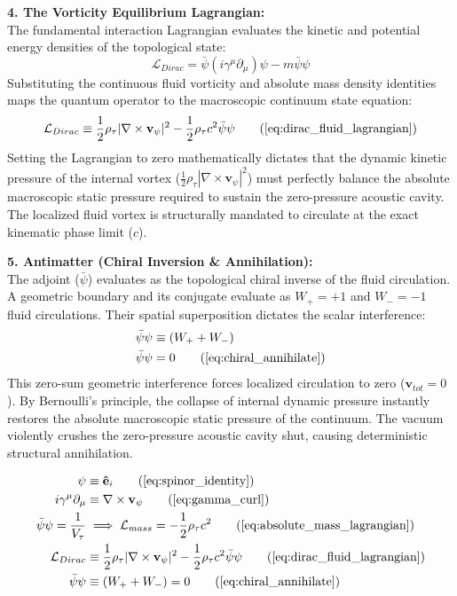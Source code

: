 \documentclass[11pt, a4paper]{article}
\begin{document}
\textbf{4. The Vorticity Equilibrium Lagrangian:} \\
The fundamental interaction Lagrangian evaluates the kinetic and potential energy densities of the topological state:
\begin{equation}
    \mathcal{L}_{Dirac} = \bar{\psi} (i\gamma^\mu \partial_\mu) \psi - m\bar{\psi}\psi 
\end{equation}
Substituting the continuous fluid vorticity and absolute mass density identities maps the quantum operator   to the macroscopic continuum state equation:
\begin{equation}
    \mathcal{L}_{Dirac} \equiv \frac{1}{2}\rho_{\tau} |\nabla \times \mathbf{v}_\psi|^2 - \frac{1}{2} \rho_{\tau} c^2 \bar{\psi}\psi \tag{\ref{eq:dirac_fluid_lagrangian}}
\end{equation}
Setting the Lagrangian to zero mathematically dictates that the dynamic kinetic pressure of the internal vortex ($\frac{1}{2}\rho_{\tau} |\nabla \times \mathbf{v}_\psi|^2$) must perfectly balance the absolute macroscopic static pressure required to sustain the zero-pressure acoustic cavity. The localized fluid vortex is structurally mandated to circulate at the exact kinematic phase limit ($c$).

\textbf{5. Antimatter (Chiral Inversion \& Annihilation):} \\
The adjoint ($\bar{\psi}$) evaluates as the topological chiral inverse of the fluid circulation. A geometric boundary and its conjugate evaluate as $W_+ = +1$ and $W_- = -1$ fluid circulations. Their spatial superposition dictates the scalar interference:
\begin{align}
    \bar{\psi}\psi &\equiv (W_+ + W_-) \nonumber \\
    \bar{\psi}\psi &= 0 \tag{\ref{eq:chiral_annihilate}}
\end{align}
This zero-sum geometric interference forces localized circulation to zero ($\mathbf{v}_{tot} = 0$). By Bernoulli's principle, the collapse of internal dynamic pressure instantly restores the absolute macroscopic static pressure of the continuum. The vacuum violently crushes the zero-pressure acoustic cavity shut, causing deterministic structural annihilation.

\begin{tcolorbox}[recallbox, title={\ref{box:dirac_isomorphism}. Topological Vorticity Equilibrium (The Dirac Equation)}]
\begin{align}
    \psi &\equiv \mathbf{\hat{e}}_i \tag{\ref{eq:spinor_identity}} \\
    i\gamma^\mu \partial_\mu &\equiv \nabla \times \mathbf{v}_\psi \tag{\ref{eq:gamma_curl}} \\
    \bar{\psi} \psi = \frac{1}{V_{\tau}} &\implies \mathcal{L}_{mass} = - \frac{1}{2} \rho_{\tau} c^2 \tag{\ref{eq:absolute_mass_lagrangian}} \\
    \mathcal{L}_{Dirac} &\equiv \frac{1}{2}\rho_{\tau} |\nabla \times \mathbf{v}_\psi|^2 - \frac{1}{2} \rho_{\tau} c^2 \bar{\psi}\psi \tag{\ref{eq:dirac_fluid_lagrangian}} \\
    \bar{\psi}\psi &\equiv (W_+ + W_-) = 0 \tag{\ref{eq:chiral_annihilate}} 
\end{align}
\end{tcolorbox}
\end{document}
